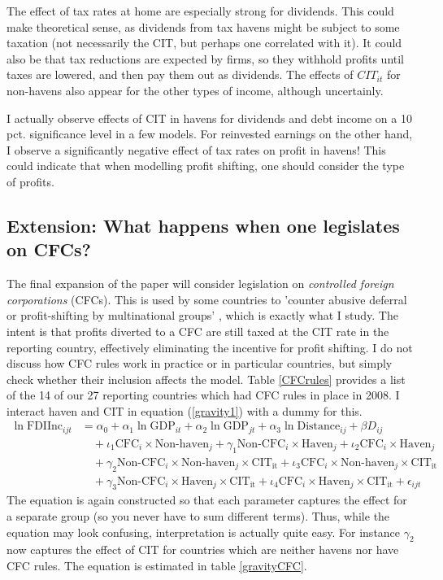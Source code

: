 \documentclass[twoside,a4paper,11pt]{article}
\begin{document}
The effect of tax rates at home are especially strong for dividends. This could make theoretical sense, as dividends from tax havens might be subject to some taxation (not necessarily the CIT, but perhaps one correlated with it). It could also be that tax reductions are expected by firms, so they withhold profits until taxes are lowered, and then pay them out as dividends. The effects of $ CIT_{it} $ for non-havens also appear for the other types of income, although  uncertainly.  

I actually observe effects of CIT in havens for dividends and debt income on a 10 pct. significance level in a few models. For reinvested earnings on the other hand, I observe a significantly negative effect of tax rates on profit in havens! This could indicate that when modelling profit shifting, one should consider the type of profits. 

\subsection{Extension: What happens when one legislates on CFCs?}
The final expansion of the paper will consider legislation on \textit{controlled foreign corporations} (CFCs). This is used by some countries to 'counter abusive deferral or
profit-shifting by multinational groups' \autocite[1067]{voget_relocation_2011}, which is exactly what I study. The intent is that profits diverted to a CFC are still taxed at the CIT rate in the reporting country, effectively eliminating the incentive for profit shifting. I do not discuss how CFC rules work in practice or in particular countries, but simply check whether their inclusion affects the model. Table \ref{CFCrules} provides a list of the 14 of our 27 reporting countries which had CFC rules in place in 2008. I interact haven and CIT in equation (\ref{gravity1}) with a dummy for this. 
\begin{equation}\label{gravityCFC}
\begin{aligned}
\ln\text{FDIInc}_{ijt} &= \alpha_0 + \alpha_1\ln\text{GDP}_{it}+\alpha_2\ln\text{GDP}_{jt}+ \alpha_3\ln\text{Distance}_{ij}+\beta D_{ij} \\
&\quad + 
\iota_1\text{CFC}_i\times\text{Non-haven}_j +\gamma_1\text{Non-CFC}_i\times \text{Haven}_j  +  \iota_2\text{CFC}_i\times\text{Haven}_j \\
&\quad + \gamma_2\text{Non-CFC}_i\times\text{Non-haven}_j\times\text{CIT}_\text{it} 
+ \iota_3 \text{CFC}_i\times\text{Non-haven}_j\times \text{CIT}_\text{it}  \\
&\quad + \gamma_3 \text{Non-CFC}_i\times\text{Haven}_j\times \text{CIT}_\text{it} 
+ \iota_4 \text{CFC}_i\times\text{Haven}_j\times \text{CIT}_\text{it} 
 + \epsilon_{ijt}
\end{aligned}
\end{equation}
The equation is again constructed so that each parameter captures the effect for a separate group (so you never have to sum different terms). Thus, while the equation may look confusing, interpretation is actually quite easy. For instance $ \gamma_2 $ now captures the effect of CIT for countries which are neither havens nor have CFC rules. The equation is estimated in table \ref{gravityCFC}. 
\end{document}
